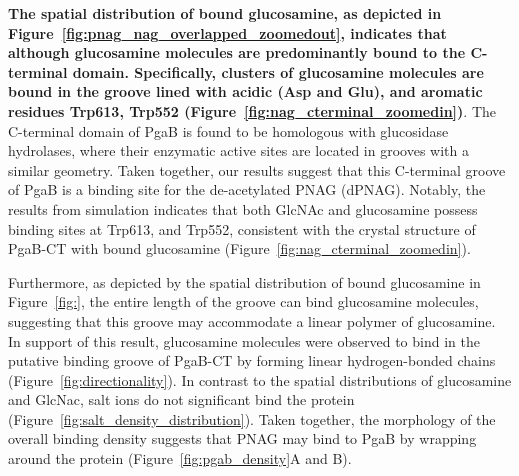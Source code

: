 \textbf{The spatial distribution of bound glucosamine, as depicted in Figure~\ref{fig:pnag_nag_overlapped_zoomedout}, indicates that although glucosamine molecules are predominantly bound to the C-terminal domain. Specifically, clusters of glucosamine molecules are bound in the groove lined with acidic (Asp and Glu), and aromatic residues Trp613, Trp552 (Figure~\ref{fig:nag_cterminal_zoomedin})}.  The C-terminal domain of PgaB is found to be homologous with glucosidase hydrolases, where their enzymatic active sites are located in grooves with a similar geometry. Taken together,  our results suggest that this C-terminal groove of PgaB is a binding site for the de-acetylated PNAG (dPNAG).   Notably, the results from simulation indicates that both GlcNAc and glucosamine possess  binding sites at Trp613, and Trp552, consistent with the crystal structure of PgaB-CT with bound glucosamine (Figure~\ref{fig:nag_cterminal_zoomedin}).

Furthermore, as depicted by the spatial distribution of bound glucosamine in Figure~\ref{fig:},  the entire length of the groove can bind glucosamine molecules, suggesting that this groove may accommodate a linear polymer of glucosamine.  In support of this result, glucosamine molecules were observed to bind in the putative binding groove of PgaB-CT by forming linear hydrogen-bonded chains (Figure~\ref{fig:directionality}).  In contrast to the spatial distributions of glucosamine and GlcNac, salt ions do not significant bind the protein  (Figure~\ref{fig:salt_density_distribution}). Taken together, the morphology of the overall binding density suggests that PNAG may bind to PgaB by wrapping around the protein (Figure~\ref{fig:pgab_density}A and B).  

